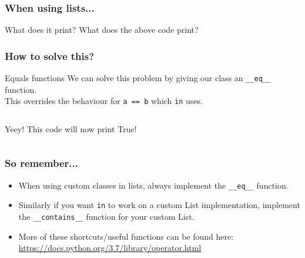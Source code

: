 \begin{frame}
	\frametitle{When using lists...}
	

	\pause
	\begin{questionblock}{What does it print?}
		What does the above code print?
	\end{questionblock}
\end{frame}

\begin{frame}
	\frametitle{How to solve this?}
			\small
		\begin{block}{Equals functions}
			We can solve this problem by giving our class an \texttt{\_\_eq\_\_} function.\\
			This overrides the behaviour for \texttt{a == b} which \texttt{in} uses.
		\end{block}	
		\vspace{-20pt}
		\begin{columns}[t]
		
				
				\begin{exampleblock}{Yeey!}
					This code will now print True!
				\end{exampleblock}	
		\end{columns}
\end{frame}

\begin{frame}
	\frametitle{So remember...}
	
	\begin{itemize}
		\item When using custom classes in lists, always implement the \texttt{\_\_eq\_\_} function.
			\pause
		\item Similarly if you want \texttt{in} to work on a custom List implementation, implement the
			\texttt{\_\_contains\_\_} function for your custom List.
			\pause
		\item More of these shortcuts/useful functions can be found here:
			\url{https://docs.python.org/3.7/library/operator.html}
	\end{itemize}
\end{frame}

